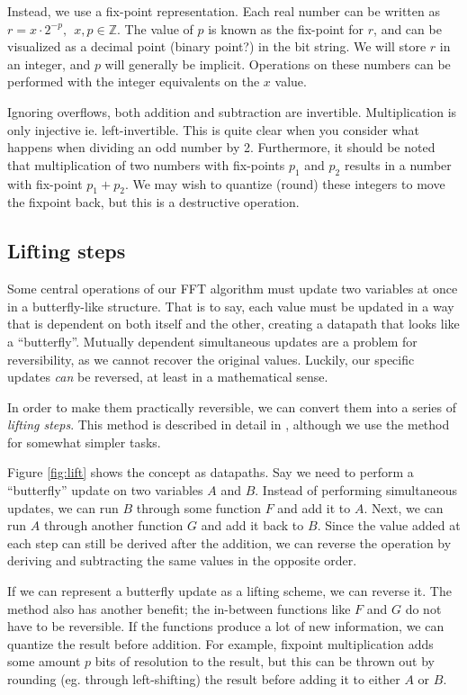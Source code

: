 Instead, we use a fix-point representation.
Each real number can be written as $r = x \cdot 2^{-p},~~ x, p \in \mathbb{Z}$.
The value of $p$ is known as the fix-point for $r$,
and can be visualized as a decimal point (binary point?) in the bit string.
We will store $r$ in an integer, and $p$ will generally be implicit.
Operations on these numbers can be performed with the integer equivalents on the $x$ value.

Ignoring overflows, both addition and subtraction are invertible.
Multiplication is only injective ie. left-invertible.
This is quite clear when you consider what happens when dividing an odd number by 2.
Furthermore, it should be noted that multiplication of two numbers with fix-points $p_1$ and $p_2$
results in a number with fix-point $p_1 + p_2$.
We may wish to quantize (round) these integers to move the fixpoint back,
but this is a destructive operation.

\subsection{Lifting steps}
Some central operations of our FFT algorithm
must update two variables at once in a butterfly-like structure.
That is to say, each value must be updated in a way that is dependent on both itself and the other,
creating a datapath that looks like a ``butterfly''.
Mutually dependent simultaneous updates are a problem for reversibility,
as we cannot recover the original values.
Luckily, our specific updates \textit{can} be reversed, at least in a mathematical sense.

In order to make them practically reversible,
we can convert them into a series of \textit{lifting steps}.
This method is described in detail in \cite{lifting1998},
although we use the method for somewhat simpler tasks.

Figure \ref{fig:lift} shows the concept as datapaths.
Say we need to perform a ``butterfly'' update on two variables $A$ and $B$.
Instead of performing simultaneous updates,
we can run $B$ through some function $F$ and add it to $A$.
Next, we can run $A$ through another function $G$ and add it back to $B$.
Since the value added at each step can still be derived after the addition,
we can reverse the operation by deriving and subtracting the same values in the opposite order.

If we can represent a butterfly update as a lifting scheme, we can reverse it.
The method also has another benefit;
the in-between functions like $F$ and $G$ do not have to be reversible.
If the functions produce a lot of new information, we can quantize the result before addition.
For example, fixpoint multiplication adds some amount $p$ bits of resolution to the result,
but this can be thrown out by rounding (eg. through left-shifting) the result
before adding it to either $A$ or $B$.


